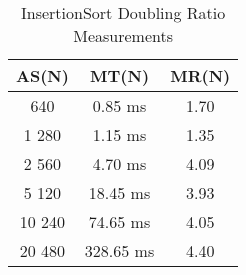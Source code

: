 \begin{table}[hp!]
    \centering
    \begin{tabular} {c | c | c}
        \textbf{AS(N)} & \textbf{MT(N)} & \textbf{MR(N)} \\
        \hline
        640 & 0.85 ms & 1.70 \\
        \hline
        1 280 & 1.15 ms & 1.35 \\
        \hline
        2 560 & 4.70 ms & 4.09 \\
        \hline
        5 120 & 18.45 ms & 3.93 \\
        \hline
        10 240 & 74.65 ms & 4.05 \\
        \hline
        20 480 & 328.65 ms & 4.40 \\
    \end{tabular}
    \caption{InsertionSort Doubling Ratio Measurements}
\end{table}
